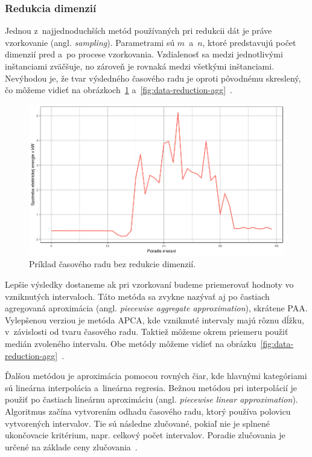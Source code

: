 \documentclass[a4paper,twoside,slovak,12pt,appendix]{article}
\begin{document}
\subsubsection{Redukcia dimenzií}
\label{c:dimension-reduction}
Jednou z~najjednoduchších metód používaných pri redukcii dát je práve
vzorkovanie (angl. \textit{sampling}). Parametrami sú $m$~a~$n$, ktoré
predstavujú počet dimenzií pred a~po procese vzorkovania. Vzdialenosť sa medzi
jednotlivými inštanciami zväčšuje, no zároveň je rovnaká medzi všetkými
inštanciami. Nevýhodou je, že tvar výsledného časového radu je oproti pôvodnému
skreslený, čo môžeme vidieť na obrázkoch~\ref{fig:data-reduction-orig}
a~\ref{fig:data-reduction-agg}~\cite{Fu2011}.

\begin{figure}[htbp]
  \centering
  \includegraphics[width=\textwidth]{data_reduction_orig.png}
  \caption{Príklad časového radu bez redukcie dimenzií.}
  \label{fig:data-reduction-orig}
\end{figure}

Lepšie výsledky dostaneme ak pri vzorkovaní budeme priemerovať hodnoty vo
vzniknutých intervaloch. Táto metóda sa zvykne nazývať aj po častiach agregovaná
aproximácia (angl. \textit{piecewise aggregate approximation}), skrátene PAA.
Vylepšenou verziou je metóda APCA, kde vzniknuté intervaly majú rôznu dĺžku,
v~závislosti od tvaru časového radu. Taktiež môžeme okrem priemeru použiť medián
zvoleného intervalu. Obe metódy môžeme vidieť na
obrázku~\ref{fig:data-reduction-agg}~\cite{Keogh2002}.

Ďalšou metódou je aproximácia pomocou rovných čiar, kde hlavnými kategóriami sú
lineárna interpolácia a~lineárna regresia. Bežnou metódou pri interpolácií je
použiť po častiach lineárnu aproximáciu (angl. \textit{piecewise linear
approximation}). Algoritmus začína vytvorením odhadu časového radu, ktorý
používa polovicu vytvorených intervalov. Tie sú následne zlučované, pokiaľ nie
je splnené ukončovacie kritérium, napr. celkový počet intervalov. Poradie
zlučovania je určené na základe ceny zlučovania~\cite{Fu2011}.
\end{document}
